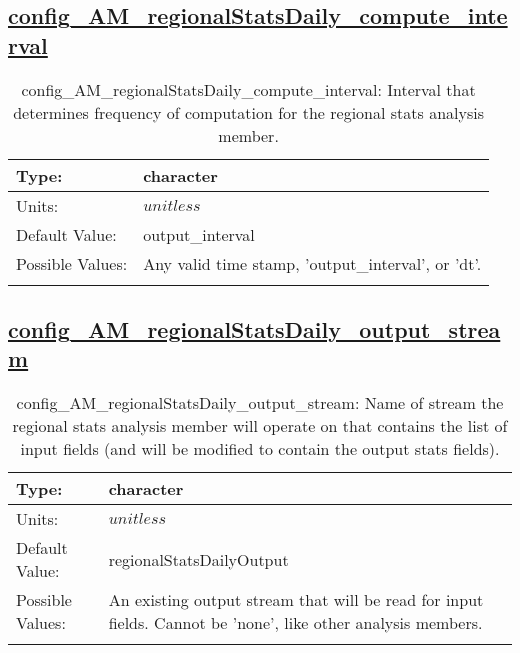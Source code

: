 \subsection[config\_AM\_regionalStatsDaily\_compute\_interval]{\hyperref[sec:nm_tab_AM_regionalStatsDaily]{config\_AM\_regionalStatsDaily\_compute\_interval}}
\label{subsec:nm_sec_config_AM_regionalStatsDaily_compute_interval}
\begin{center}
\begin{longtable}{| p{2.0in} || p{4.0in} |}
    \hline
    Type: & character \\
    \hline
    Units: & $unitless$ \\
    \hline
    Default Value: & output\_interval \\
    \hline
    Possible Values: & Any valid time stamp, 'output\_interval', or 'dt'. \\
    \hline
    \caption{config\_AM\_regionalStatsDaily\_compute\_interval: Interval that determines frequency of computation for the regional stats analysis member.}
\end{longtable}
\end{center}
\subsection[config\_AM\_regionalStatsDaily\_output\_stream]{\hyperref[sec:nm_tab_AM_regionalStatsDaily]{config\_AM\_regionalStatsDaily\_output\_stream}}
\label{subsec:nm_sec_config_AM_regionalStatsDaily_output_stream}
\begin{center}
\begin{longtable}{| p{2.0in} || p{4.0in} |}
    \hline
    Type: & character \\
    \hline
    Units: & $unitless$ \\
    \hline
    Default Value: & regionalStatsDailyOutput \\
    \hline
    Possible Values: & An existing output stream that will be read for input fields. Cannot be 'none', like other analysis members. \\
    \hline
    \caption{config\_AM\_regionalStatsDaily\_output\_stream: Name of stream the regional stats analysis member will operate on that contains the list of input fields (and will be modified to contain the output stats fields).}
\end{longtable}
\end{center}
